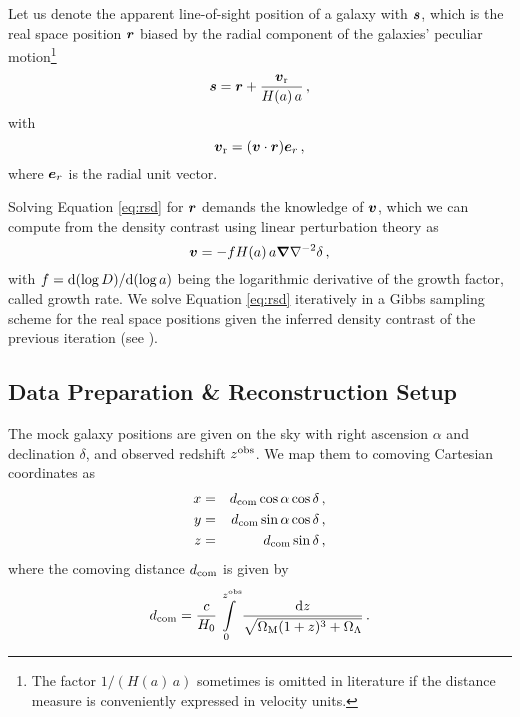 \documentclass[twocolumn]{aastex63}
\newcommand{\mbi}[1]{\hbox{\boldmath{$#1$}}}
\newcommand{\be}{\begin{equation}}
\newcommand{\ee}{\end{equation}}
\newcommand{\ba}{\begin{eqnarray}}
\newcommand{\ea}{\end{eqnarray}}
\begin{document}
\begin{CJK*}{UTF8}{gbsn}
Let us denote the apparent line-of-sight position of a galaxy with $\mbi s$, which is the real space position $\mbi r$ biased by the 
radial component of the galaxies' peculiar motion\footnote{The factor $1/(H(a)\,a)$ sometimes is omitted in literature if the distance measure is conveniently expressed in velocity units.}
\be
\label{eq:rsd}
\mbi s = \mbi r + \frac{\mbi{v}_{\rm r}}{H(a)\,a} \, ,
\ee
with
\be
\mbi{v}_{\rm r} = (\mbi v \cdot \mbi r)\mbi{e}_r \, ,
\ee
where $\mbi{e}_r$ is the radial unit vector.

Solving Equation \ref{eq:rsd} for $\mbi r$ demands the knowledge of $\mbi v $, which we can compute from the density contrast using linear perturbation theory as
\be
\mbi v = -f H(a)\, a \mbi \nabla \nabla^{-2} \delta\, ,
\ee
with $f={\rm d} (\log D)/{\rm d } (\log a)$ being the logarithmic derivative of the growth factor, called growth rate.
We solve Equation \ref{eq:rsd} iteratively in a Gibbs sampling scheme for the real space positions given the inferred density contrast of the previous iteration (see \citealt{kitaura:2016}).

\subsection{Data Preparation \& Reconstruction Setup}\label{sec:recon_setup}

The mock galaxy positions are given on the sky with right ascension $\alpha$ and declination $\delta$, and observed redshift $z^{\rm obs}$.
We map them to comoving Cartesian coordinates as
\ba \label{eq:coord_to_xyz}
x &=& d_{\rm com}\cos{\alpha}\cos{\delta}\, , \nonumber \\
y &=& d_{\rm com}\sin{\alpha}\cos{\delta}\, , \nonumber \\
z &=& d_{\rm com}\sin{\delta}\, , 
\ea
where the comoving distance $d_{\rm com}$ is given by
\be \label{eq:dcom}
d_{\rm com} = \frac{c}{H_0}  \int\limits_0^{z^{\rm obs}} \frac{{\rm d}z}{\sqrt{\Omega_{\rm M}(1+z)^3+\Omega_\Lambda} } \, .
\ee



\end{CJK*}
\end{document}
